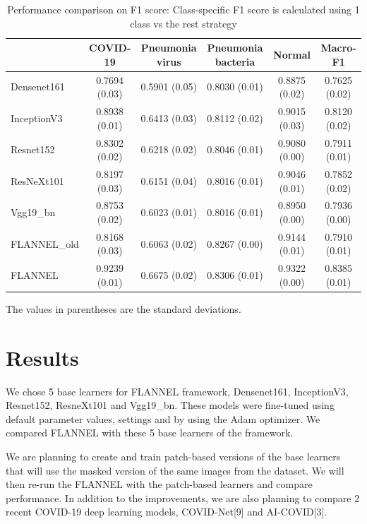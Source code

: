 \documentclass{sigkddExp}
\begin{document}
\begin{table}
    \centering
    \caption{Performance comparison on F1 score: Class-specific F1 score is calculated using 1 class vs the rest strategy}
    \label{table:resultstats}
    \begin{tabular}{ lccccc } \hline
                      & COVID-19      & Pneumonia virus & Pneumonia bacteria &
        Normal        & Macro-F1 \\ \hline

        Densenet161   & 0.7694 (0.03) & 0.5901 (0.05)   & 0.8030 (0.01)      &
        0.8875 (0.02) & 0.7625 (0.02) \\
        InceptionV3   & 0.8938 (0.01) & 0.6413 (0.03)   & 0.8112 (0.02)      &
        0.9015 (0.03) & 0.8120 (0.02) \\
        Resnet152     & 0.8302 (0.02) & 0.6218 (0.02)   & 0.8046 (0.01)      &
        0.9080 (0.00) & 0.7911 (0.01) \\
        ResNeXt101    & 0.8197 (0.03) & 0.6151 (0.04)   & 0.8016 (0.01)      &
        0.9046 (0.01) & 0.7852 (0.02) \\
        Vgg19\_bn     & 0.8753 (0.02) & 0.6023 (0.01)   & 0.8016 (0.01)      &
        0.8950 (0.00) & 0.7936 (0.00) \\
        FLANNEL\_old  & 0.8168 (0.03) & 0.6063 (0.02)   & 0.8267 (0.00)      &
        0.9144 (0.01) & 0.7910 (0.01) \\
        FLANNEL       & 0.9239 (0.01) & 0.6675 (0.02)   & 0.8306 (0.01)      &
        0.9322 (0.00) & 0.8385 (0.01) \\ \hline
    \end{tabular}\par
    \bigskip
    The values in parentheses are the standard deviations.
\end{table}

\section{Results}

We chose 5 base learners for FLANNEL framework, Densenet161, InceptionV3,
Resnet152, ResneXt101 and Vgg19\_bn. These models were fine-tuned using default
parameter values, settings and by using the Adam optimizer. We compared FLANNEL
with these 5 base learners of the framework.

We are planning to create and train patch-based versions of the base learners
that will use the masked version of the same images from the dataset. We will
then re-run the FLANNEL with the patch-based learners and compare performance.
In addition to the improvements, we are  also planning to compare 2 recent
COVID-19 deep learning models, COVID-Net[9] and AI-COVID[3].
\end{document}
